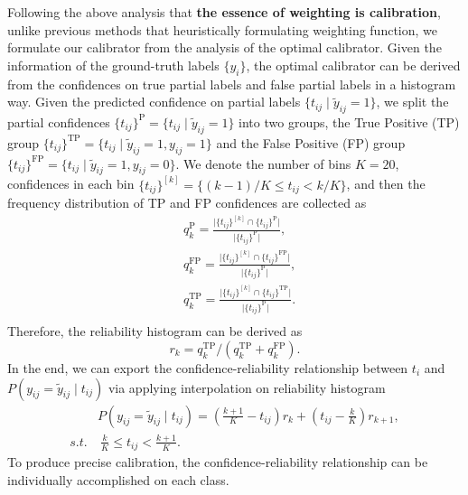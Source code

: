 \documentclass[letterpaper]{article} %
\begin{document}
  Following the above analysis that \textbf{the essence of weighting is calibration}, unlike previous methods that heuristically formulating weighting function, we formulate our calibrator from the analysis of the optimal calibrator. Given the information of the ground-truth labels $\{y_i\}$, the optimal calibrator can be derived from the confidences on true partial labels and false partial labels in a histogram way. 
  Given the predicted confidence on partial labels $\{t_{ij} \mid \tilde y_{ij} = 1\}$, we split the partial confidences
    $\{t_{ij}\}^\text{P} = \{t_{ij} \mid \tilde y_{ij} = 1\}$ 
  into two groups, the True Positive (TP) group 
    $\{t_{ij}\}^\text{TP} = \{t_{ij} \mid \tilde y_{ij} = 1, y_{ij} = 1\}$ 
  and the False Positive (FP) group
    $\{t_{ij}\}^\text{FP} = \{t_{ij} \mid \tilde y_{ij} = 1, y_{ij} = 0\}$. 
  We denote the number of bins $K = 20$, confidences in each bin $\{t_{ij}\}^{[k]} = \{ (k-1)/K \leq t_{ij} < k/K\}$, and then the frequency distribution of TP and FP confidences are collected as
  \begin{equation}
  \label{eq:frequency}
  \begin{aligned}
    & q^\text{P}_k = \frac{ \lvert \{t_{ij}\}^{[k]} \cap \{t_{ij}\}^\text{P} \rvert }{ \lvert \{t_{ij}\}^\text{P} \rvert }, \\
    & q^\text{FP}_k = \frac{ \lvert \{t_{ij}\}^{[k]} \cap \{t_{ij}\}^\text{FP} \rvert }{ \lvert \{t_{ij}\}^\text{P} \rvert }, \\
    & q^\text{TP}_k = \frac{ \lvert \{t_{ij}\}^{[k]} \cap \{t_{ij}\}^\text{TP} \rvert }{ \lvert \{t_{ij}\}^\text{P} \rvert }. \\
  \end{aligned}  
  \end{equation}
  Therefore, the reliability histogram can be derived as
  \begin{equation}
  \label{eq:reliablity}
    r_k = q^\text{TP}_k / (q^\text{TP}_k + q^\text{FP}_k).
  \end{equation}
  In the end, we can export the confidence-reliability relationship between $t_i$ and $P(y_{ij} = \tilde y_{ij} \mid t_{ij})$ via applying interpolation on reliability histogram 
  \begin{equation}
  \label{eq:interpolation}
  \begin{aligned}
    & P(y_{ij} = \tilde y_{ij} \mid t_{ij}) = (\frac{k+1}{K} - t_{ij}) r_k + (t_{ij} - \frac{k}{K}) r_{k+1}, \\
    s.t. &  \ \frac{k}{K} \leq t_{ij} < \frac{k+1}{K}.
  \end{aligned}
  \end{equation}
  To produce precise calibration, the confidence-reliability relationship can be individually accomplished on each class. 
\end{document}
